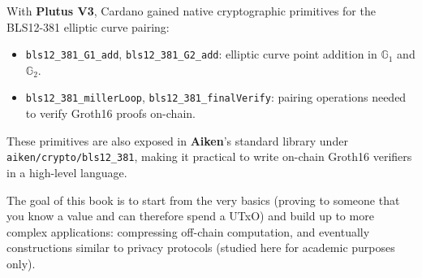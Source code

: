 With \textbf{Plutus V3}, Cardano gained native cryptographic primitives for the BLS12-381 elliptic curve pairing:

\begin{itemize}
  \item \texttt{bls12\_381\_G1\_add}, \texttt{bls12\_381\_G2\_add}: elliptic curve point addition in $\mathbb{G}_1$ and $\mathbb{G}_2$.
  \item \texttt{bls12\_381\_millerLoop}, \texttt{bls12\_381\_finalVerify}: pairing operations needed to verify Groth16 proofs on-chain.
\end{itemize}

These primitives are also exposed in \textbf{Aiken}'s standard library under \texttt{aiken/crypto/bls12\_381}, making it practical to write on-chain Groth16 verifiers in a high-level language.

The goal of this book is to start from the very basics (proving to someone that you know a value and can therefore spend a UTxO) and build up to more complex applications: compressing off-chain computation, and eventually constructions similar to privacy protocols (studied here for academic purposes only).
